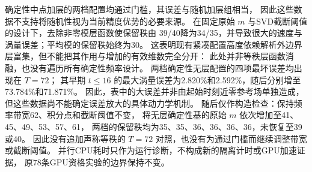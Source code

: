 确定性中点加层的两档配置均通过门槛，其误差与随机加层组相当，
因此这些数据不支持将随机性视为当前精度优势的必要来源。
在固定原始 $m$ 与SVD截断阈值的设计下，去除非零模层函数使保留秩由
39/40降为34/35，并导致很大的速度与涡量误差；平均模的保留秩始终为30。
这表明现有紧凑配置高度依赖解析外边界层富集，但不能把其作用与增加的有效维数完全分开：
此处并非等秩层函数消融，也没有遍历所有确定性频率设计。
两档确定性无层配置的四项最坏误差均出现在 $T=72$；
其早期 $t\leq16$ 的最大涡量误差为2.820\%和2.592\%，随后分别增至73.784\%和71.871\%。
因此，表中的大误差并非由起始时刻近零参考场单独造成，但这些数据尚不能确定误差放大的具体动力学机制。
随后仅作构造检查：保持频率带宽62、积分点和截断阈值不变，
将无层确定性基的原始 $m$ 依次增加至41、45、49、53、57、61，
两档的保留秩均为35、35、36、36、36、36，未恢复至39或40。
因此没有追加声称等秩的 $T=72$ 对照，也没有为通过门槛而继续调整带宽或截断阈值。
并行CPU耗时只作为运行诊断，不构成新的隔离计时或GPU加速证据，
原78条GPU资格实验的边界保持不变。





